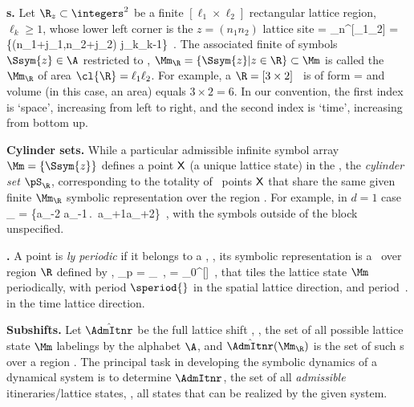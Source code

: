 {\bf {\Brick s}.} Let
$\R_{z}\subset\integers^2$  be a finite
$[\ell_1\!\times\!\ell_2]$ rectangular lattice region,
$\ell_k\geq1$,
whose lower left corner is the $z=(n_{1}n_{2})$ lattice site
\beq
  \R = \R_{n}^{[\ell_1\!\times\!\ell_2]}
  =\{(n_1+j_1,\cdots n_2+j_2) \leq j_k\leq \ell_k-1\}
\,.
The associated finite {\brick} of symbols $\Ssym{z}\in\A$ restricted to  \R,
\(
\Mm_{\R}=\{\Ssym{z}| z\in \R \} \subset \Mm
\)
is called the \brick\ $\Mm_{\R}$ of area
$\cl{\R} = \ell_1 \ell_2$. For example,
a
$\R = [3\times 2]$ \brick\ is of form
\beq
\Mm=
and volume (in this case, an area) equals $3\times 2 = 6$.
In our convention, the first index is `space', increasing from left to right,
and the second index is `time', increasing from bottom up.

{\bf Cylinder sets.}
While a particular admissible infinite symbol array
\(
\Mm= \{\Ssym{z}\} %
\)
defines a point $\mathsf{X}$ (a unique lattice state) in the \statesp,
the \emph{cylinder set}
$\pS_{\R}$,
corresponding to the totality  of
\statesp\ points $\mathsf{X}$ that share the same given finite {\brick} $\Mm_{\R}$
symbolic representation over the region \R. For example, in $d=1$ case
\beq
\pS_{\R} =
    \{\cdots a_{-2} a_{-1}\,.\,
   \cdots \Ssym{\ell}
   a_{\ell+1}a_{\ell+2}\cdots\}
\,,
with the symbols outside of the block unspecified.

{\bf \twoTs.}
A {\statesp} point is {\em {\spt}ly periodic} if
it belongs to a \twot, \ie, its symbolic representation is a \brick\
over region $\R$ defined by ,
\beq
  \Mm_{p} = \Mm_{\R}
  \,,\qquad
  \R = \R_{0}^{[\speriod{}\!\times\!\period{}]}
\,,
that
tiles the lattice state  $\Mm$ periodically, with period $\speriod{}$ in the
spatial lattice direction, and period $\period{}$ in the
time lattice direction.


{\bf Subshifts.}
Let $\hat{\AdmItnr}$ be the full lattice shift
, \ie, %
the set of all possible lattice state $\Mm$ labelings by the alphabet
$\A$, and $\hat{\AdmItnr}(\Mm_{\R})$ is
the set of such {\brick s} over a region {\R}. The principal task
in developing the symbolic dynamics of a dynamical system is to determine
$\AdmItnr$, the set of all \emph{admissible} itineraries/lattice states,
\ie, all states that can be realized by the given system.

